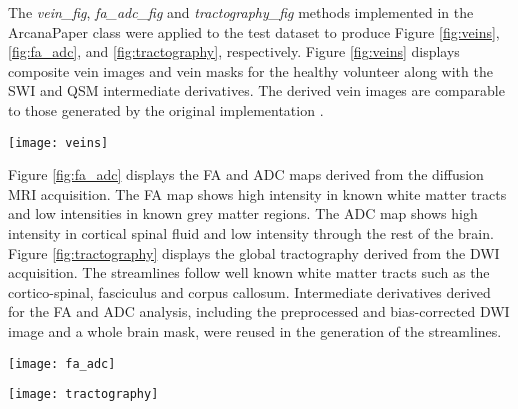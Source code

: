 \documentclass[smallextended]{svjour3}       %
\begin{document}
The \emph{vein\_fig}, \emph{fa\_adc\_fig} and \emph{tractography\_fig} methods
implemented in the ArcanaPaper class were applied to the test dataset to produce
Figure \ref{fig:veins}, \ref{fig:fa_adc}, and \ref{fig:tractography}, respectively.
Figure \ref{fig:veins} displays composite vein images and vein masks for the healthy
volunteer along with the SWI and QSM intermediate derivatives.
The derived vein images are comparable to those
generated by the original implementation \citep{ward_combining_2018}.

\begin{figure*}
    \centering
    \texttt{[image: veins]}
  \caption{Composite vein image (\emph{third row}) constructed by
  combining susceptibility weighted imaging (SWI) (\emph{top row}),
  quantitative susceptibility mapping (QSM) (\emph{second row})
  and a vein atlas from manual tracings. A vein mask was then
  generated (\emph{bottom row}) from the composite
  vein image.
  \emph{left column}: axial slices. \emph{centre column}: coronal slices.
  \emph{right column}: sagittal slices.}
\label{fig:veins}
\end{figure*}

Figure \ref{fig:fa_adc}  displays the FA and ADC maps derived from the diffusion MRI
acquisition. The FA map shows high intensity in known white matter
tracts and low intensities in known grey matter regions. The ADC map
shows high intensity in cortical spinal fluid and low intensity through
the rest of the brain.
Figure \ref{fig:tractography} displays the global tractography derived from the DWI
acquisition. The streamlines follow well known white matter tracts such
as the cortico-spinal, fasciculus and corpus callosum. Intermediate
derivatives derived for the FA and ADC analysis, including the
preprocessed and bias-corrected DWI image and a whole brain mask, were
reused in the generation of the streamlines.

\begin{figure*}
    \centering
    \texttt{[image: fa\_adc]}
  \caption{Fractional Anisotropy (FA) \emph{(top row)} and
Apparent Diffusion Coefficient (ADC) (\emph{bottom rowI)} derived from
diffusion MRI data. \emph{Left column:} axial midline slices.
\emph{Middle column:} coronal midline slices. \emph{Left column}:
sagittal midline slices.}
\label{fig:fa_adc}
\end{figure*}


\begin{figure*}
    \centering
    \texttt{[image: tractography]}
  \caption{Global tractography performed using the MRtrix
toolbox. Probabilistic streamlines generated with the iFOD2 algorithm
from fibre Orientation Distribution Function (fODF) estimated from
diffusion MRI datasets using Constrained Spherical Deconvolution (CSD).
Streamlines are colour-encoded by orientation: green=anterior-posterior,
blue=inferior-superior, red=left-right. \emph{Left panel:} axial midline
slice. \emph{Middle panel:} coronal midline slice. \emph{Left panel}:
sagittal midline slice.}
\label{fig:tractography}
\end{figure*}
\end{document}
